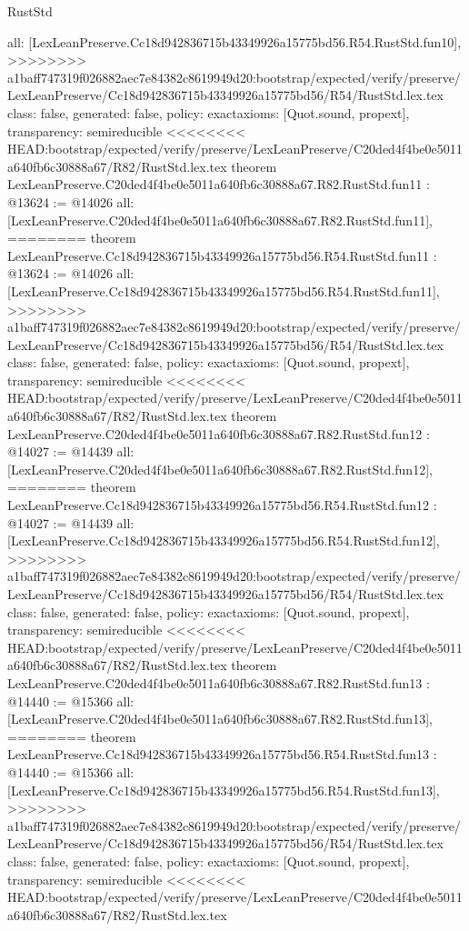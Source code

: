 \begin{lexlean}{RustStd}
\begin{coremodule}
{\begin{coremodule}
{{{{{{{{{{{{{{  all: [LexLeanPreserve.Cc18d942836715b43349926a15775bd56.R54.RustStd.fun10],
>>>>>>>> a1baff747319f026882aec7e84382c8619949d20:bootstrap/expected/verify/preserve/LexLeanPreserve/Cc18d942836715b43349926a15775bd56/R54/RustStd.lex.tex
  class: false,
  generated: false,
  policy: exact{axioms: [Quot.sound, propext]},
  transparency: semireducible
}
<<<<<<<< HEAD:bootstrap/expected/verify/preserve/LexLeanPreserve/C20ded4f4be0e5011a640fb6c30888a67/R82/RustStd.lex.tex
theorem LexLeanPreserve.C20ded4f4be0e5011a640fb6c30888a67.R82.RustStd.fun11 : @13624 := @14026 {
  all: [LexLeanPreserve.C20ded4f4be0e5011a640fb6c30888a67.R82.RustStd.fun11],
========
theorem LexLeanPreserve.Cc18d942836715b43349926a15775bd56.R54.RustStd.fun11 : @13624 := @14026 {
  all: [LexLeanPreserve.Cc18d942836715b43349926a15775bd56.R54.RustStd.fun11],
>>>>>>>> a1baff747319f026882aec7e84382c8619949d20:bootstrap/expected/verify/preserve/LexLeanPreserve/Cc18d942836715b43349926a15775bd56/R54/RustStd.lex.tex
  class: false,
  generated: false,
  policy: exact{axioms: [Quot.sound, propext]},
  transparency: semireducible
}
<<<<<<<< HEAD:bootstrap/expected/verify/preserve/LexLeanPreserve/C20ded4f4be0e5011a640fb6c30888a67/R82/RustStd.lex.tex
theorem LexLeanPreserve.C20ded4f4be0e5011a640fb6c30888a67.R82.RustStd.fun12 : @14027 := @14439 {
  all: [LexLeanPreserve.C20ded4f4be0e5011a640fb6c30888a67.R82.RustStd.fun12],
========
theorem LexLeanPreserve.Cc18d942836715b43349926a15775bd56.R54.RustStd.fun12 : @14027 := @14439 {
  all: [LexLeanPreserve.Cc18d942836715b43349926a15775bd56.R54.RustStd.fun12],
>>>>>>>> a1baff747319f026882aec7e84382c8619949d20:bootstrap/expected/verify/preserve/LexLeanPreserve/Cc18d942836715b43349926a15775bd56/R54/RustStd.lex.tex
  class: false,
  generated: false,
  policy: exact{axioms: [Quot.sound, propext]},
  transparency: semireducible
}
<<<<<<<< HEAD:bootstrap/expected/verify/preserve/LexLeanPreserve/C20ded4f4be0e5011a640fb6c30888a67/R82/RustStd.lex.tex
theorem LexLeanPreserve.C20ded4f4be0e5011a640fb6c30888a67.R82.RustStd.fun13 : @14440 := @15366 {
  all: [LexLeanPreserve.C20ded4f4be0e5011a640fb6c30888a67.R82.RustStd.fun13],
========
theorem LexLeanPreserve.Cc18d942836715b43349926a15775bd56.R54.RustStd.fun13 : @14440 := @15366 {
  all: [LexLeanPreserve.Cc18d942836715b43349926a15775bd56.R54.RustStd.fun13],
>>>>>>>> a1baff747319f026882aec7e84382c8619949d20:bootstrap/expected/verify/preserve/LexLeanPreserve/Cc18d942836715b43349926a15775bd56/R54/RustStd.lex.tex
  class: false,
  generated: false,
  policy: exact{axioms: [Quot.sound, propext]},
  transparency: semireducible
}
<<<<<<<< HEAD:bootstrap/expected/verify/preserve/LexLeanPreserve/C20ded4f4be0e5011a640fb6c30888a67/R82/RustStd.lex.tex
}}}}}}}}}}}}}}}}
\end{coremodule}}
\end{coremodule}
\end{lexlean}
